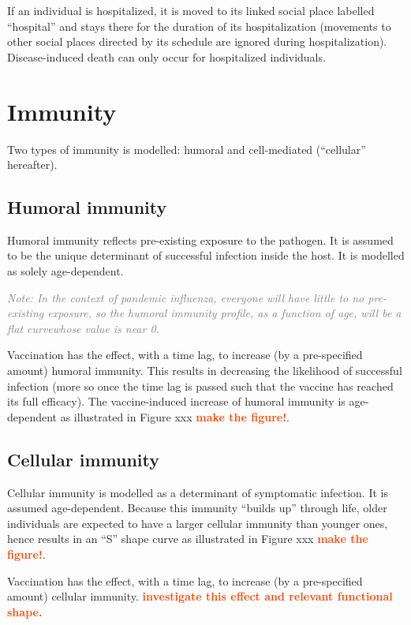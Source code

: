 \documentclass[11pt, onecolumn]{article}
\newcommand{\warning}[1]{\textbf{\textcolor{OrangeRed}{#1}}}
\newcommand{\note}[1]{\textit{\textcolor{Grey}{Note: #1}}}
\begin{document}
If an individual is hospitalized, it is moved to its linked social place labelled ``hospital'' and stays there for the duration of its hospitalization (movements to other social places directed by its schedule are ignored during hospitalization). Disease-induced death can only occur for hospitalized individuals.


\section{Immunity}

Two types of immunity is modelled: humoral and cell-mediated (``cellular'' hereafter). 

\subsection{Humoral immunity}	
Humoral immunity reflects pre-existing exposure to the pathogen. It is assumed to be the unique determinant of successful infection inside the host. It is modelled as solely age-dependent.
	
\note{In the context of pandemic influenza, everyone will have little to no pre-existing exposure, so the humoral immunity profile, as a function of age, will be a flat curvewhose value is near 0.}

Vaccination has the effect, with a time lag, to increase (by a pre-specified amount) humoral immunity. This results in decreasing the likelihood of successful infection (more so once the time lag is passed such that the vaccine has reached its full efficacy). The vaccine-induced increase of humoral immunity is age-dependent as illustrated in Figure xxx \warning{make the figure!}. 

\subsection{Cellular immunity}	

Cellular immunity is modelled as a determinant of symptomatic infection. It is assumed age-dependent. Because this immunity ``builds up'' through life, older individuals are expected to have a larger cellular immunity than younger ones, hence results in an ``S'' shape curve as illustrated in Figure xxx \warning{make the figure!}.

Vaccination has the effect, with a time lag, to increase (by a pre-specified amount) cellular immunity. \warning{investigate this effect and relevant functional shape.}
\end{document}
